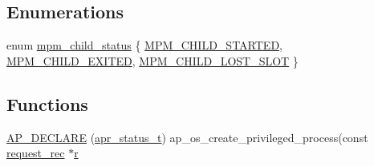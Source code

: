 \subsection*{Enumerations}
\begin{DoxyCompactItemize}
\item 
enum \hyperlink{group__APACHE__CORE__MPM_ga2ad69bc5389eabd0ec49889d8bf67be3}{mpm\+\_\+child\+\_\+status} \{ \hyperlink{group__APACHE__CORE__MPM_gga2ad69bc5389eabd0ec49889d8bf67be3ad09a361e8798f0f62adbdcc16a2071d6}{M\+P\+M\+\_\+\+C\+H\+I\+L\+D\+\_\+\+S\+T\+A\+R\+T\+ED}, 
\hyperlink{group__APACHE__CORE__MPM_gga2ad69bc5389eabd0ec49889d8bf67be3a1d3f429655bf7e887321b76278fdd447}{M\+P\+M\+\_\+\+C\+H\+I\+L\+D\+\_\+\+E\+X\+I\+T\+ED}, 
\hyperlink{group__APACHE__CORE__MPM_gga2ad69bc5389eabd0ec49889d8bf67be3ad89397173e3d26b331728fd7a1f7e3f1}{M\+P\+M\+\_\+\+C\+H\+I\+L\+D\+\_\+\+L\+O\+S\+T\+\_\+\+S\+L\+OT}
 \}
\end{DoxyCompactItemize}
\subsection*{Functions}
\begin{DoxyCompactItemize}
\item 
\hyperlink{group__APACHE__CORE__MPM_ga6d6637e2c01ec8d38101a66d960fea79}{A\+P\+\_\+\+D\+E\+C\+L\+A\+RE} (\hyperlink{group__apr__errno_gaa5105fa83cc322f09382292db8b47593}{apr\+\_\+status\+\_\+t}) ap\+\_\+os\+\_\+create\+\_\+privileged\+\_\+process(const \hyperlink{structrequest__rec}{request\+\_\+rec} $\ast$\hyperlink{pcregrep_8txt_a2e9e9438b26c0bb4425367a7e4f75eb3}{r}
\end{DoxyCompactItemize}
